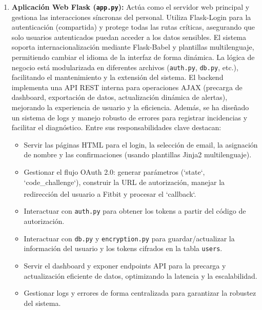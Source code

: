 \begin{enumerate}
    \item \textbf{Aplicación Web Flask (\texttt{app.py}):} Actúa como el servidor web principal y gestiona las interacciones síncronas del personal. Utiliza Flask-Login para la autenticación (compartida) y protege todas las rutas críticas, asegurando que solo usuarios autenticados puedan acceder a los datos sensibles. El sistema soporta internacionalización mediante Flask-Babel y plantillas multilenguaje, permitiendo cambiar el idioma de la interfaz de forma dinámica. La lógica de negocio está modularizada en diferentes archivos (\texttt{auth.py}, \texttt{db.py}, etc.), facilitando el mantenimiento y la extensión del sistema. El backend implementa una API REST interna para operaciones AJAX (precarga de dashboard, exportación de datos, actualización dinámica de alertas), mejorando la experiencia de usuario y la eficiencia. Además, se ha diseñado un sistema de logs y manejo robusto de errores para registrar incidencias y facilitar el diagnóstico. Entre sus responsabilidades clave destacan:
        \begin{itemize}
            \item Servir las páginas HTML para el login, la selección de email, la asignación de nombre y las confirmaciones (usando plantillas Jinja2 multilenguaje).
            \item Gestionar el flujo OAuth 2.0: generar parámetros (`state`, `code\_challenge`), construir la URL de autorización, manejar la redirección del usuario a Fitbit\textsuperscript{\textregistered} y procesar el `callback`.
            \item Interactuar con \texttt{auth.py} para obtener los tokens a partir del código de autorización.
            \item Interactuar con \texttt{db.py} y \texttt{encryption.py} para guardar/actualizar la información del usuario y los tokens cifrados en la tabla \texttt{users}.
            \item Servir el dashboard y exponer endpoints API para la precarga y actualización eficiente de datos, optimizando la latencia y la escalabilidad.
            \item Gestionar logs y errores de forma centralizada para garantizar la robustez del sistema.
        \end{itemize}


\end{enumerate}

